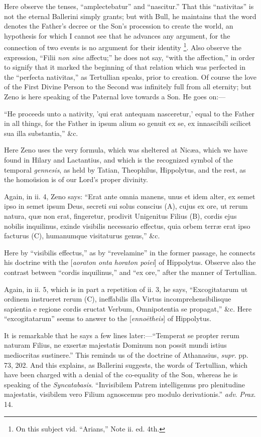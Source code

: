 Here observe the tenses, ``amplectebatur'' and ``nascitur.''
That this ``nativitas'' is not the eternal Ballerini simply
grants; but with Bull, he maintains that the word denotes the Father's
decree or the Son's procession to create the world, an hypothesis for
which I cannot see that he advances any argument, for the connection
of two events is no argument for their identity \footnote{On this subject
vid. ``Arians,'' Note ii. ed. 4th.}. Also observe the expression, ``Filii \emph{non} \emph{sine}
affectu;'' he does not say, ``with the affection,'' in
order to signify that it marked the beginning of that relation which
was perfected in the ``perfecta nativitas,'' as Tertullian
speaks, prior to creation. Of course the love of the First Divine
Person to the Second was infinitely full from all eternity; but Zeno
is here speaking of the Paternal love towards a Son. He goes on:—

``He proceeds unto a nativity, 'qui erat antequam nasceretur,'
equal to the Father in all things, for the Father in ipsum alium so
genuit ex se, ex innascibili scilicet sua illa substantia,''
\&c.

Here Zeno uses the very formula, which was sheltered at Nicæa,
which we have found in Hilary and Lactantius, and which is the
recognized symbol of the temporal \emph{gennesis}, as held by
Tatian, Theophilus, Hippolytus, and the rest, as the homoüsion is of
our Lord's proper divinity.

Again, in ii. 4, Zeno says: ``Erat ante omnia manens, unus et
idem alter, ex semet ipso in semet ipsum Deus, secreti sui solus
conscius (A), cujus ex ore, ut rerum natura, quæ non erat, fingeretur,
prodivit Unigenitus Filius (B), cordis ejus nobilis inquilinus, exinde
visibilis necessario effectus, quia orbem terræ erat ipso facturus
(C), humanumque visitaturus genus,'' \&c.

Here by ``visibilis effectus,'' as by ``revelamine''
in the former passage, he connects his doctrine with the [\emph{aoraton
onta horaton poiei}] of Hippolytus. Observe also the contrast
between ``cordis inquilinus,'' and ``ex ore,'' after
the manner of Tertullian.

Again, in ii. 5, which is in part a repetition of ii. 3, he says,
``Excogitatarum ut ordinem instrueret rerum (C), ineffabilis illa
Virtus incomprehensibilisque sapientia e regione cordis eructat Verbum,
Omnipotentia se propagat,'' \&c. Here ``excogitatarum''
seems to answer to the [\emph{enno\={e}theis}] of Hippolytus.

It is remarkable that he says a few lines later:—``Temperat
se propter rerum naturam Filius, ne exsertæ majestatis Dominum non
possit mundi istius mediocritas sustinere.'' This reminds us of
the doctrine of Athanasius, \emph{supr}. pp. 73, 202. And this
explains, as Ballerini suggests, the words of Tertullian, which have
been charged with a denial of the co-equality of the Son, whereas he
is speaking of the \emph{Syncatabasis}. ``Invisibilem Patrem
intelligemus pro plenitudine majestatis, visibilem vero Filium
agnoscemus pro modulo derivationis.'' \emph{adv}. \emph{Prax}. 14.


